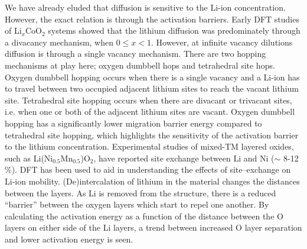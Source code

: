 \documentclass[../main.tex]{subfiles}
\begin{document}
We have already eluded that diffusion is sensitive to the Li-ion concentration. However, the exact relation is through the activation barriers. Early DFT studies \cite{van2000lithium,van2001lithium} of Li$_x$CoO$_2$ systems showed that the lithium diffusion was predominately through a divacancy mechanism, when $0\leq x < 1$. However, at infinite vacancy dilutions diffusion is through a single vacancy mechanism. \cite{islam2014lithium} There are two hopping mechanisms at play here; oxygen dumbbell hops and tetrahedral site hops. Oxygen dumbbell hopping occurs when there is a single vacancy and a Li-ion has to travel between two occupied adjacent lithium sites to reach the vacant lithium site. Tetrahedral site hopping occurs when there are divacant or trivacant sites, i.e.  when one or both of the adjacent lithium sites are vacant. \cite{van2001lithium} Oxygen dumbbell hopping has a significantly lower migration barrier energy compared to tetrahedral site hopping, which highlights the sensitivity of the activation barrier to the lithium concentration. Experimental studies of mixed-TM layered oxides, such as Li(Ni$_{0.5}$Mn$_{0.5}$)O$_2$, have reported site exchange between Li and Ni ($\sim$ 8-12 \%).\cite{choi2005structural} DFT has been used to aid in understanding the effects of site--exchange on Li-ion mobility. \cite{kang2006electrodes,laubach2009structure} (De)intercalation of lithium in the material changes the distances between the layers. As Li is removed from the structure, there is a reduced ``barrier'' between the oxygen layers which start to repel one another. By calculating the activation energy as a function of the distance between the O layers on either side of the Li layers, a trend between increased O layer separation and lower activation energy is seen. \cite{kang2006electrodes,laubach2009structure}
\end{document}
